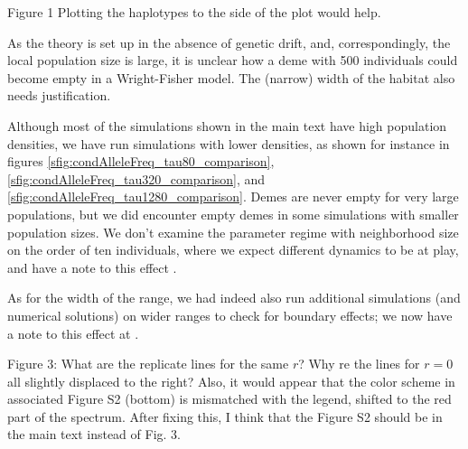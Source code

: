 \reply
{}


\begin{point}{Figure 1}
 Plotting the haplotypes to the side of the plot would help.
\end{point}

\reply
{}


\begin{point}{\revref}
 As the theory is set up in the absence of genetic drift, and, correspondingly, the local population size is large, it is unclear how a deme with 500 individuals could become empty in a Wright-Fisher model.  The (narrow) width of the habitat also needs justification.
\end{point}

\reply
Although most of the simulations shown in the main text have high population densities,
we have run simulations with lower densities, 
as shown for instance in figures \ref{sfig:condAlleleFreq_tau80_comparison}, \ref{sfig:condAlleleFreq_tau320_comparison}, and \ref{sfig:condAlleleFreq_tau1280_comparison}.
Demes are never empty for very large populations, but
we did encounter empty demes in some simulations with smaller population sizes.
We don't examine the parameter regime with neighborhood size on the order of ten individuals,
where we expect different dynamics to be at play,
and have a note to this effect .

As for the width of the range, we had indeed also run additional simulations (and numerical solutions) on wider ranges to check for boundary effects;
we now have a note to this effect at .

\begin{point}{Figure 3:}
What are the replicate lines for the same $r$? Why re the lines for $r = 0$ all slightly displaced to the right? Also, it would appear that the color scheme in associated Figure S2 (bottom) is mismatched with the legend, shifted to the red part of the spectrum. After fixing this, I think that the Figure S2 should be in the main text instead of Fig. 3.
\end{point}

\reply
{}

